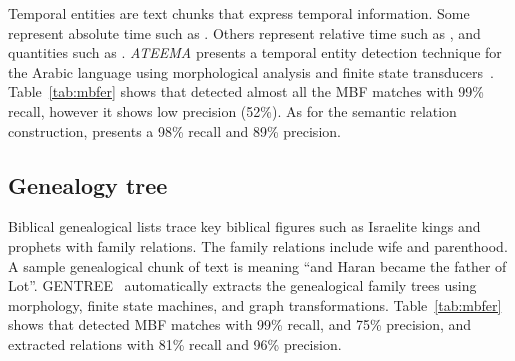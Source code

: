 Temporal entities are text chunks that express temporal information. 
Some represent absolute time such as . 
Others represent relative time such as , and quantities 
such as . 
{\em ATEEMA} presents a temporal entity detection technique for the Arabic language using 
morphological analysis and finite state transducers~\cite{ZaMa2012IJCLATime}. 
%
Table~\ref{tab:mbfer} shows that \framework detected almost all the MBF matches with 99\% recall, 
however it shows low precision (52\%). 
As for the semantic relation construction, \framework presents a 98\% recall and 89\% precision.

\vspace{-2em}
\subsection{Genealogy tree}
\vspace{-1em}

Biblical genealogical lists trace key biblical figures such as Israelite kings and
prophets with family relations. 
The family relations include wife and parenthood. 
A sample genealogical chunk of text is  
meaning ``and Haran became the father of Lot''.
%
GENTREE~\cite{ZaMaHaCicling2012Entity} 
automatically extracts the genealogical family trees using morphology, 
finite state machines, and graph transformations. 
Table~\ref{tab:mbfer} shows that \framework detected 
MBF matches with 99\% recall, and 75\% precision, and
extracted relations with 81\% recall and 96\% precision.

